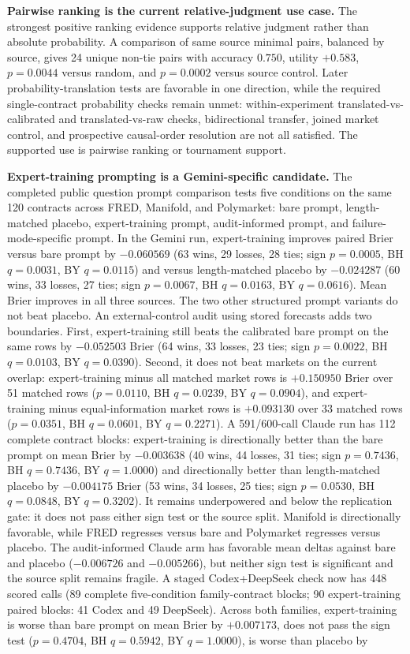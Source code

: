 \documentclass[11pt]{article}
\begin{document}
\textbf{Pairwise ranking is the current relative-judgment use case.} The strongest positive ranking evidence supports relative judgment rather than absolute probability. A comparison of same source minimal pairs, balanced by source, gives 24 unique non-tie pairs with accuracy \(0.750\), utility \(+0.583\), \(p=0.0044\) versus random, and \(p=0.0002\) versus source control. Later probability-translation tests are favorable in one direction, while the required single-contract probability checks remain unmet: within-experiment translated-vs-calibrated and translated-vs-raw checks, bidirectional transfer, joined market control, and prospective causal-order resolution are not all satisfied. The supported use is pairwise ranking or tournament support.

\textbf{Expert-training prompting is a Gemini-specific candidate.} The completed public question prompt comparison tests five conditions on the same 120 contracts across FRED, Manifold, and Polymarket: bare prompt, length-matched placebo, expert-training prompt, audit-informed prompt, and failure-mode-specific prompt. In the Gemini run, expert-training improves paired Brier versus bare prompt by \(-0.060569\) (63 wins, 29 losses, 28 ties; sign \(p=0.0005\), BH \(q=0.0031\), BY \(q=0.0115\)) and versus length-matched placebo by \(-0.024287\) (60 wins, 33 losses, 27 ties; sign \(p=0.0067\), BH \(q=0.0163\), BY \(q=0.0616\)). Mean Brier improves in all three sources. The two other structured prompt variants do not beat placebo. An external-control audit using stored forecasts adds two boundaries. First, expert-training still beats the calibrated bare prompt on the same rows by \(-0.052503\) Brier (64 wins, 33 losses, 23 ties; sign \(p=0.0022\), BH \(q=0.0103\), BY \(q=0.0390\)). Second, it does not beat markets on the current overlap: expert-training minus all matched market rows is \(+0.150950\) Brier over 51 matched rows (\(p=0.0110\), BH \(q=0.0239\), BY \(q=0.0904\)), and expert-training minus equal-information market rows is \(+0.093130\) over 33 matched rows (\(p=0.0351\), BH \(q=0.0601\), BY \(q=0.2271\)). A 591/600-call Claude run has 112 complete contract blocks: expert-training is directionally better than the bare prompt on mean Brier by \(-0.003638\) (40 wins, 44 losses, 31 ties; sign \(p=0.7436\), BH \(q=0.7436\), BY \(q=1.0000\)) and directionally better than length-matched placebo by \(-0.004175\) Brier (53 wins, 34 losses, 25 ties; sign \(p=0.0530\), BH \(q=0.0848\), BY \(q=0.3202\)). It remains underpowered and below the replication gate: it does not pass either sign test or the source split. Manifold is directionally favorable, while FRED regresses versus bare and Polymarket regresses versus placebo. The audit-informed Claude arm has favorable mean deltas against bare and placebo (\(-0.006726\) and \(-0.005266\)), but neither sign test is significant and the source split remains fragile. A staged Codex+DeepSeek check now has 448 scored calls (89 complete five-condition family-contract blocks; 90 expert-training paired blocks: 41 Codex and 49 DeepSeek). Across both families, expert-training is worse than bare prompt on mean Brier by \(+0.007173\), does not pass the sign test (\(p=0.4704\), BH \(q=0.5942\), BY \(q=1.0000\)), is worse than placebo by 
\end{document}
